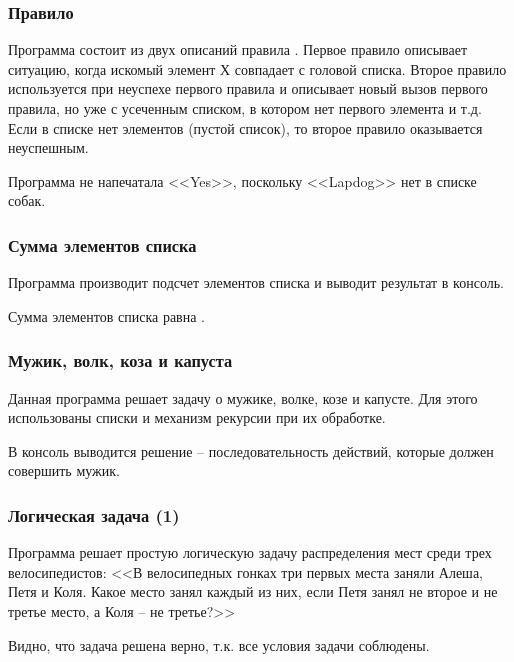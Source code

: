\subsubsection{Правило }

Программа состоит из двух описаний правила . Первое правило описывает ситуацию, когда искомый элемент Х совпадает с головой списка. Второе правило используется при неуспехе первого правила и описывает новый вызов первого правила, но уже с усеченным списком, в котором нет первого элемента и т.д. Если в списке нет элементов (пустой список), то второе правило оказывается неуспешным.


Программа не напечатала <<Yes>>, поскольку <<Lapdog>> нет в списке собак.

\subsubsection{Сумма элементов списка}

Программа производит подсчет элементов списка и выводит результат в консоль. 


Сумма элементов списка \code{[4, 4, 2, 5, 4, 3, 100]} равна .

\subsubsection{Мужик, волк, коза и капуста}

Данная программа решает задачу о мужике, волке, козе и капусте. Для этого использованы списки и механизм рекурсии при их обработке.


В консоль выводится решение -- последовательность действий, которые должен совершить мужик.

\subsubsection{Логическая задача (1)}

Программа решает простую логическую задачу распределения мест среди трех велосипедистов: <<В велосипедных гонках три первых места заняли Алеша, Петя и Коля. Какое место занял каждый из них, если Петя занял не второе и не третье место, а Коля – не третье?>>


Видно, что задача решена верно, т.к. все условия задачи соблюдены.

